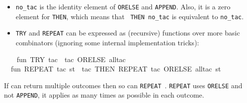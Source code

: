\begin{isabellebody}
\begin{isamarkuptext}
\begin{itemize}
  \item \verb|no_tac| is the identity element of \verb|ORELSE| and
  \verb|APPEND|.  Also, it is a zero element for \verb|THEN|,
  which means that ~\verb|THEN|~\verb|no_tac| is
  equivalent to \verb|no_tac|.

  \item \verb|TRY| and \verb|REPEAT| can be expressed as (recursive)
  functions over more basic combinators (ignoring some internal
  implementation tricks):

  \end{itemize}%
\end{isamarkuptext}%
\isamarkuptrue%
%
\endisatagmlex
{\isafoldmlex}%
%
\isadelimmlex
%
\endisadelimmlex
%
\isadelimML
%
\endisadelimML
%
\isatagML
{}\isamarkupfalse%
\ {}\isanewline
\ \ fun\ TRY\ tac\ {}\ tac\ ORELSE\ all{}tac{}\isanewline
\ \ fun\ REPEAT\ tac\ st\ {}\ {}{}tac\ THEN\ REPEAT\ tac{}\ ORELSE\ all{}tac{}\ st{}\isanewline
{}%
\endisatagML
{\isafoldML}%
%
\isadelimML
%
\endisadelimML
%
\begin{isamarkuptext}%
If  can return multiple outcomes then so can \verb|REPEAT|~.  \verb|REPEAT| uses \verb|ORELSE| and not
  \verb|APPEND|, it applies  as many times as
  possible in each outcome.


\end{isamarkuptext}
\end{isabellebody}

